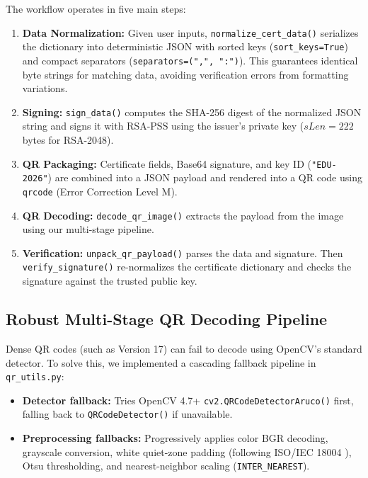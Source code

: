 \documentclass[10pt,a4paper]{article}
\begin{document}
The workflow operates in five main steps:
\begin{enumerate}
    \setlength{\itemsep}{0pt}
    \setlength{\parskip}{0pt}
    \item \textbf{Data Normalization:} Given user inputs, \texttt{normalize\_cert\_data()} serializes the dictionary into deterministic JSON with sorted keys (\texttt{sort\_keys=True}) and compact separators (\texttt{separators=(",", ":")}). This guarantees identical byte strings for matching data, avoiding verification errors from formatting variations.
    \item \textbf{Signing:} \texttt{sign\_data()} computes the SHA-256 digest of the normalized JSON string and signs it with RSA-PSS using the issuer's private key ($sLen = 222$ bytes for RSA-2048).
    \item \textbf{QR Packaging:} Certificate fields, Base64 signature, and key ID (\texttt{"EDU-2026"}) are combined into a JSON payload and rendered into a QR code using \texttt{qrcode} (Error Correction Level M).
    \item \textbf{QR Decoding:} \texttt{decode\_qr\_image()} extracts the payload from the image using our multi-stage pipeline.
    \item \textbf{Verification:} \texttt{unpack\_qr\_payload()} parses the data and signature. Then \texttt{verify\_signature()} re-normalizes the certificate dictionary and checks the signature against the trusted public key.
\end{enumerate}

\subsection{Robust Multi-Stage QR Decoding Pipeline}
Dense QR codes (such as Version 17) can fail to decode using OpenCV's standard detector. To solve this, we implemented a cascading fallback pipeline in \texttt{qr\_utils.py}:
\begin{itemize}
    \setlength{\itemsep}{0pt}
    \setlength{\parskip}{0pt}
    \item \textbf{Detector fallback:} Tries OpenCV 4.7+ \texttt{cv2.}\allowbreak\texttt{QRCodeDetector}\allowbreak\texttt{Aruco()} first, falling back to \texttt{QRCodeDetector()} if unavailable.
    \item \textbf{Preprocessing fallbacks:} Progressively applies color BGR decoding, grayscale conversion, white quiet-zone padding (following ISO/IEC 18004 \cite{iso18004}), Otsu thresholding, and nearest-neighbor scaling (\texttt{INTER\_NEAREST}).
\end{itemize}
\end{document}
